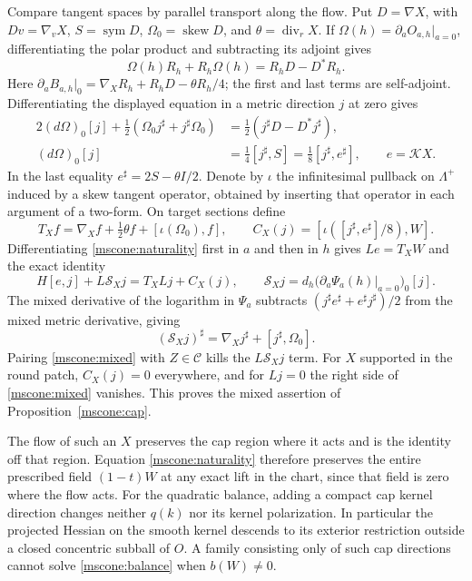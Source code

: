 \documentclass[11pt]{article}
\numberwithin{equation}{section}
\theoremstyle{definition}
\theoremstyle{remark}
\begin{document}
Compare tangent spaces by parallel transport along the flow.
Put \(D=\nabla X\), with \(Dv=\nabla_vX\),
\(S=\operatorname{sym}D\), \(\Omega_0=\operatorname{skew}D\),
and \(\theta=\operatorname{div}_rX\).
If \(\Omega(h)=\partial_a O_{a,h}|_{a=0}\), differentiating the
polar product and subtracting its adjoint gives
\[
 \Omega(h)R_h+R_h\Omega(h)=R_hD-D^*R_h .
\]
Here \(\partial_a B_{a,h}|_0=\nabla_XR_h+R_hD-\theta R_h/4\);
the first and last terms are self-adjoint. Differentiating
the displayed equation in a metric direction \(j\) at zero gives
\begin{equation}\label{mscone:polar}
 \begin{aligned}
 2(d\Omega)_0[j]+\tfrac12(\Omega_0j^\sharp+j^\sharp\Omega_0)
   &=\tfrac12(j^\sharp D-D^*j^\sharp),\\
 (d\Omega)_0[j]&=\tfrac14[j^\sharp,S]
                  =\tfrac18[j^\sharp,e^\sharp],
                 \qquad e=\mathcal K X.
 \end{aligned}
\end{equation}
In the last equality \(e^\sharp=2S-\theta I/2\).
Denote by \(\iota\) the infinitesimal pullback on \(\Lambda^+\)
induced by a skew tangent operator, obtained by inserting that
operator in each argument of a two-form. On target sections define
\[
 T_X f=\nabla_Xf+\tfrac12\theta f+[\iota(\Omega_0),f],
 \qquad C_X(j)=[\iota([j^\sharp,e^\sharp]/8),W].
\]
Differentiating \eqref{mscone:naturality} first in \(a\) and then in
\(h\) gives \(Le=T_XW\) and the exact identity
\begin{equation}\label{mscone:mixed}
 H[e,j]+L\mathcal S_X j=T_XLj+C_X(j),
 \qquad \mathcal S_X j=d_h\big(\partial_a\Psi_a(h)|_{a=0}\big)_0[j].
\end{equation}
The mixed derivative of the logarithm in \(\Psi_a\) subtracts
\((j^\sharp e^\sharp+e^\sharp j^\sharp)/2\) from the mixed metric
derivative, giving
\[
 (\mathcal S_X j)^\sharp=\nabla_Xj^\sharp+[j^\sharp,\Omega_0].
\]
Pairing \eqref{mscone:mixed} with \(Z\in\mathcal C\) kills the
\(L\mathcal S_Xj\) term. For \(X\) supported in
the round patch, \(C_X(j)=0\) everywhere, and for \(Lj=0\)
the right side of \eqref{mscone:mixed} vanishes. This proves
the mixed assertion of Proposition~\ref{mscone:cap}.

The flow of such an \(X\) preserves the cap region where it
acts and is the identity off that region. Equation
\eqref{mscone:naturality} therefore preserves the entire prescribed
field \((1-t)W\) at any exact lift in the chart, since that field is
zero where the flow acts. For the quadratic balance, adding a compact
cap kernel direction changes neither \(q(k)\) nor its kernel
polarization. In particular the projected Hessian on the smooth kernel
descends to its exterior restriction outside a closed concentric
subball of \(O\). A family consisting only of such cap directions
cannot solve \eqref{mscone:balance} when \(b(W)\ne0\).
\end{document}
